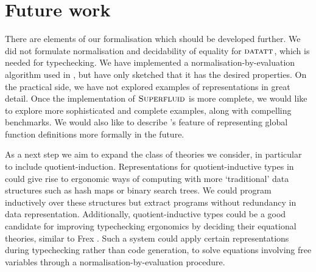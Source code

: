 
\section{Future work}


There are elements of our formalisation which should be developed further. We
did not formulate normalisation and decidability of equality for ${\textsc{datatt}}$,
which is needed for typechecking. We have implemented a
normalisation-by-evaluation algorithm used in \superfluid, but have only
sketched that it has the desired properties. On the practical side, we have not
explored examples of representations in great detail. Once the implementation of
$\textsc{Superfluid}$ is more complete, we would like to explore more sophisticated and
complete examples, along with compelling benchmarks. We would also like to
describe \superfluid's feature of representing global function definitions more
formally in the future.

As a next step we aim to expand the class of theories we consider, in particular
to include quotient-induction. Representations for quotient-inductive types in
could give rise to ergonomic ways of computing with more `traditional' data
structures such as hash maps or binary search trees. We could program
inductively over these structures but extract programs without redundancy in
data representation. Additionally, quotient-inductive types could be a good
candidate for improving typechecking ergonomics by deciding their equational
theories, similar to Frex \cite{Allais2023-rg}. Such a system could
apply certain representations during typechecking rather than code generation,
to solve equations involving free variables through a normalisation-by-evaluation  \cite{Altenkirch2020-rm}
procedure.


